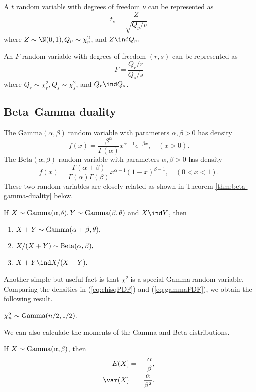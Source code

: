 A $t$ random variable with degrees of freedom $\nu$ can be represented
as 
$$
t_{\nu}=\frac{ Z}{ \sqrt{Q_{\nu}  / \nu }    } 
$$ 
where $Z\sim\N(0,1),Q_{\nu}\sim\chi_{\nu}^{2}$, 
and $Z\ind Q_{\nu}.$ 

An $F$ random variable with degrees of freedom $(r,s)$ can be represented
as
\[
F=\frac{Q_{r}/r}{Q_{s}/s}
\]
where $Q_{r}\sim\chi_{r}^{2},Q_{s}\sim\chi_{s}^{2}$, and $Q_{r}\ind Q_{s}$. 

\subsection{Beta--Gamma duality}

The $\text{Gamma}(\alpha,\beta)$ random variable with parameters
$\alpha,\beta>0$ has density
\begin{equation}
f(x)=\frac{\beta^{\alpha}}{\Gamma(\alpha)}x^{\alpha-1}e^{-\beta x},\quad(x>0).\label{eq:gammaPDF}
\end{equation}
The $\text{Beta}(\alpha,\beta)$ random variable with parameters $\alpha,\beta>0$
has density
\[
f(x)=\frac{\Gamma(\alpha+\beta)}{\Gamma(\alpha)\Gamma(\beta)}x^{\alpha-1}(1-x)^{\beta-1},\quad(0<x<1).
\]
These two random variables are closely related as shown in
Theorem \ref{thm:beta-gamma-duality} below. 


\begin{theorem}
\label{thm:beta-gamma-duality}If $X\sim\textup{Gamma}(\alpha,\theta),Y\sim\textup{Gamma}(\beta,\theta)$
and $X\ind Y$, then
\begin{enumerate}
\item $X+Y\sim\textup{Gamma}(\alpha+\beta,\theta),$
\item $X/(X+Y)\sim\textup{Beta}(\alpha,\beta),$
\item $X+Y\ind X/(X+Y).$
\end{enumerate}
\end{theorem}



Another simple but useful fact is that $\chi^{2}$ is a special Gamma
random variable. Comparing the densities in (\ref{eq:chisqPDF}) and
(\ref{eq:gammaPDF}), we obtain the following result.
\begin{proposition}\label{prop::chi2-gamma}
$\chi_{n}^{2}\sim\textup{Gamma}(n/2,1/2).$
\end{proposition}
We can also calculate the moments of the Gamma and Beta distributions.
\begin{proposition}
\label{thm:gammamoments}If $X\sim\textup{Gamma}(\alpha,\beta)$,
then
\begin{eqnarray*}
E(X) &=&\frac{\alpha}{\beta},\\ 
\var(X) &=&\frac{\alpha}{\beta^{2}}.
\end{eqnarray*}
\end{proposition}


